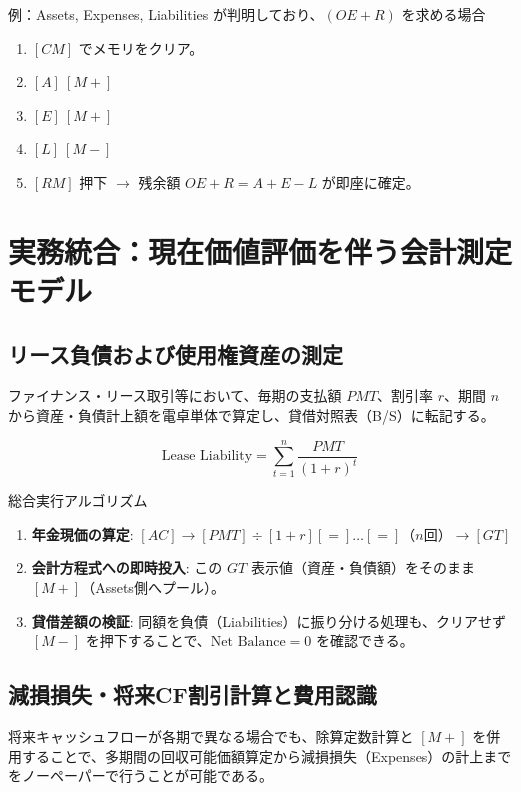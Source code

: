 \begin{calcbox}{例：Assets, Expenses, Liabilities が判明しており、$(OE + R)$ を求める場合}
\begin{enumerate}
    \item $[CM]$ でメモリをクリア。
    \item $[A] \ [M+]$
    \item $[E] \ [M+]$
    \item $[L] \ [M-]$
    \item $[RM]$ 押下 $\to$ 残余額 $OE + R = A + E - L$ が即座に確定。
\end{enumerate}
\end{calcbox}

\chapter{実務統合：現在価値評価を伴う会計測定モデル}

\section{リース負債および使用権資産の測定}
ファイナンス・リース取引等において、毎期の支払額 $PMT$、割引率 $r$、期間 $n$ から資産・負債計上額を電卓単体で算定し、貸借対照表（B/S）に転記する。

\begin{equation}
    \text{Lease Liability} = \sum_{t=1}^n \frac{PMT}{(1+r)^t}
\end{equation}

\begin{calcbox}{総合実行アルゴリズム}
\begin{enumerate}
    \item \textbf{年金現価の算定}:
    $[AC] \to [PMT] \div [1+r] [=] \dots [=]$（$n$回）$\to [GT]$
    \item \textbf{会計方程式への即時投入}:
    この $GT$ 表示値（資産・負債額）をそのまま $[M+]$（Assets側へプール）。
    \item \textbf{貸借差額の検証}:
    同額を負債（Liabilities）に振り分ける処理も、クリアせず $[M-]$ を押下することで、$\text{Net Balance} = 0$ を確認できる。
\end{enumerate}
\end{calcbox}

\section{減損損失・将来CF割引計算と費用認識}
将来キャッシュフローが各期で異なる場合でも、除算定数計算と $[M+]$ を併用することで、多期間の回収可能価額算定から減損損失（Expenses）の計上までをノーペーパーで行うことが可能である。
